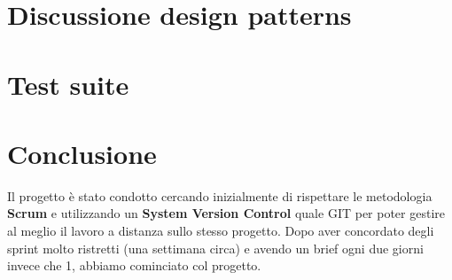 \documentclass[12pt, a4paper]{article}
\numberwithin{equation}{section} %
\begin{document}





\section{Discussione design patterns}


\section{Test suite}


\section{Conclusione}
Il progetto è stato condotto cercando inizialmente di rispettare le metodologia \textbf{Scrum} e utilizzando un \textbf{System Version Control} quale GIT per poter gestire al meglio il lavoro a distanza sullo stesso progetto. Dopo aver concordato degli sprint molto ristretti (una settimana circa) e avendo un brief ogni due giorni invece che 1, abbiamo cominciato col progetto.
\end{document}
